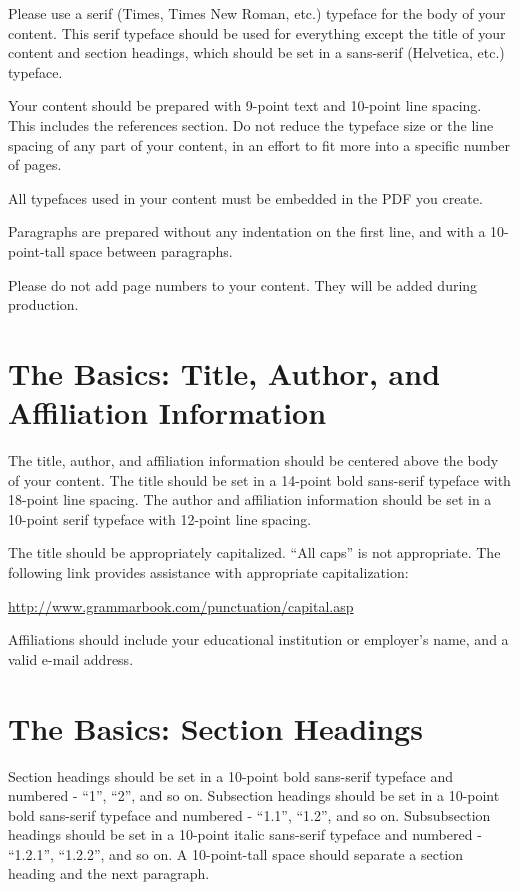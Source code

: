 \documentclass[tog]{acmsiggraph}
\begin{document}
Please use a serif (Times, Times New Roman, etc.) typeface for the
body of your content. This serif typeface should be used for
everything except the title of your content and section headings,
which should be set in a sans-serif (Helvetica, etc.) typeface.

Your content should be prepared with 9-point text and 10-point line
spacing. This includes the references section. Do not reduce the
typeface size or the line spacing of any part of your content, in an
effort to fit more into a specific number of pages. 

All typefaces used in your content must be embedded in the PDF you
create. 

Paragraphs are prepared without any indentation on the first line, and
with a 10-point-tall space between paragraphs.

Please do not add page numbers to your content. They will be added
during production.

\section{The Basics: Title, Author, and Affiliation Information}

The title, author, and affiliation information should be centered
above the body of your content. The title should be set in a 14-point
bold sans-serif typeface with 18-point line spacing. The author and
affiliation information should be set in a 10-point serif typeface
with 12-point line spacing.

The title should be appropriately capitalized. ``All caps'' is not
appropriate. The following link provides assistance with appropriate
capitalization:

{\small\url{http://www.grammarbook.com/punctuation/capital.asp}}

Affiliations should include your educational institution or employer's
name, and a valid e-mail address.

\section{The Basics: Section Headings}

Section headings should be set in a 10-point bold sans-serif typeface
and numbered - ``1'', ``2'', and so on. Subsection headings should be
set in a 10-point bold sans-serif typeface and numbered - ``1.1'',
``1.2'', and so on. Subsubsection headings should be set in a 10-point
italic sans-serif typeface and numbered - ``1.2.1'', ``1.2.2'', and so
on. A 10-point-tall space should separate a section heading and the
next paragraph.
\end{document}
